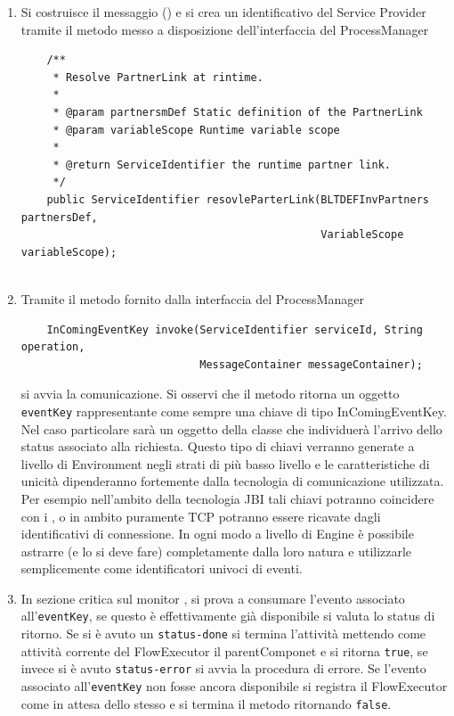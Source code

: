 \begin{enumerate}
  \item Si costruisce il messaggio () e si crea un
  identificativo del Service Provider tramite il metodo messo a disposizione
  dell'interfaccia del ProcessManager
  \lstset{frame=NONE}
  \begin{lstlisting}
  	/**
     * Resolve PartnerLink at rintime.
     * 
     * @param partnersmDef Static definition of the PartnerLink
     * @param variableScope Runtime variable scope
     * 
     * @return ServiceIdentifier the runtime partner link.
     */
    public ServiceIdentifier resovleParterLink(BLTDEFInvPartners partnersDef, 
											   VariableScope variableScope);
    
  \end{lstlisting}  
  
  \item Tramite il metodo fornito dalla interfaccia del ProcessManager
  \begin{lstlisting}
  	InComingEventKey invoke(ServiceIdentifier serviceId, String operation, 
							MessageContainer messageContainer);
  \end{lstlisting}
  si avvia la comunicazione. Si osservi che il metodo ritorna un oggetto
  \texttt{eventKey} rappresentante come sempre una chiave di tipo
  InComingEventKey. Nel caso particolare sarà un oggetto della classe
   che individuerà l'arrivo dello status
  associato alla richiesta. Questo tipo di chiavi verranno generate a livello di
  Environment negli strati di più basso livello e le caratteristiche di unicità dipenderanno fortemente dalla tecnologia di comunicazione
 utilizzata. Per esempio nell'ambito della tecnologia JBI tali chiavi potranno
 coincidere con i , o in ambito puramente TCP potranno
 essere ricavate dagli identificativi di connessione. In ogni modo a livello di Engine
 \`e possibile astrarre (e lo si deve fare) completamente dalla loro natura e
 utilizzarle semplicemente come identificatori univoci di eventi.
  
  \item In sezione critica sul monitor , si
  prova a consumare l'evento associato all'\texttt{eventKey}, se questo \`e
  effettivamente già disponibile si valuta lo status di ritorno. Se si \`e
  avuto un \texttt{status-done} si termina l'attività mettendo come
  attività corrente del FlowExecutor il parentComponet e si ritorna
  \texttt{true}, se invece si \`e avuto \texttt{status-error} si avvia la
  procedura di errore. Se l'evento associato all'\texttt{eventKey} non fosse
  ancora disponibile si registra il FlowExecutor come in attesa dello stesso e
  si termina il metodo  ritornando \texttt{false}.
  

\end{enumerate}
